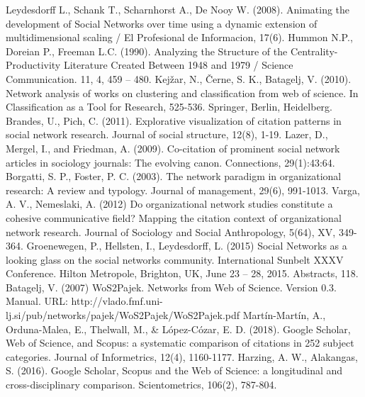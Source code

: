 \documentclass[11pt]{article} %
\begin{document}
\begin{thebibliography}{99}
   Leydesdorff L., Schank T., Scharnhorst A., De Nooy W. (2008). Animating the development of Social Networks over time using a dynamic extension of multidimensional scaling / El Profesional de Informacion, 17(6).
   Hummon N.P., Doreian P., Freeman L.C. (1990). Analyzing the Structure of the Centrality-Productivity Literature Created Between 1948 and 1979 / Science Communication. 11, 4, 459 – 480. 
Kejžar, N., Černe, S. K., Batagelj, V. (2010). Network analysis of works on clustering and classification from web of science. In Classification as a Tool for Research, 525-536. Springer, Berlin, Heidelberg.
Brandes, U., Pich, C. (2011). Explorative visualization of citation patterns in social network research. Journal of social structure, 12(8), 1-19.
Lazer, D., Mergel, I., and Friedman, A. (2009). Co-citation of prominent social network articles in sociology journals: The evolving canon. Connections, 29(1):43:64. 
Borgatti, S. P., Foster, P. C. (2003). The network paradigm in organizational research: A review and typology. Journal of management, 29(6), 991-1013.
Varga, A. V., Nemeslaki, A. (2012) Do organizational network studies constitute a cohesive communicative field? Mapping the citation context of organizational network research. Journal of Sociology and Social Anthropology, 5(64), XV, 349-364. 
Groenewegen, P., Hellsten, I., Leydesdorff, L. (2015) Social Networks as a looking glass on the social networks community. International Sunbelt XXXV Conference. Hilton Metropole, Brighton, UK, June 23 – 28, 2015. Abstracts, 118. 
Batagelj, V. (2007) WoS2Pajek. Networks from Web of Science. Version 0.3. Manual. URL: http://vlado.fmf.uni-lj.si/pub/networks/pajek/WoS2Pajek/WoS2Pajek.pdf
Martín-Martín, A., Orduna-Malea, E., Thelwall, M., \& López-Cózar, E. D. (2018). Google Scholar, Web of Science, and Scopus: a systematic comparison of citations in 252 subject categories. Journal of Informetrics, 12(4), 1160-1177.
Harzing, A. W., Alakangas, S. (2016). Google Scholar, Scopus and the Web of Science: a longitudinal and cross-disciplinary comparison. Scientometrics, 106(2), 787-804.

\end{thebibliography}
\end{document}
